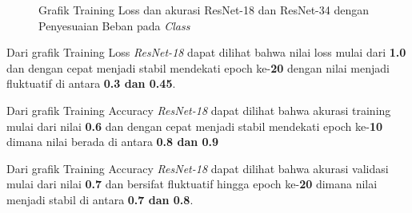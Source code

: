 \begin{figure}[hbtp]
	\centering
	\qquad
	\caption{Grafik Training Loss dan akurasi ResNet-18 dan ResNet-34 dengan Penyesuaian Beban pada \emph{Class}}
	\label{fig:graphTrainingWeightedPt1}
\end{figure}

Dari grafik Training Loss \emph{ResNet-18} dapat dilihat bahwa nilai loss mulai dari \textbf{1.0} dan dengan cepat menjadi stabil mendekati epoch ke-\textbf{20} dengan nilai menjadi fluktuatif di antara \textbf{0.3 dan 0.45}.

Dari grafik Training Accuracy \emph{ResNet-18} dapat dilihat bahwa akurasi training mulai dari nilai \textbf{0.6} dan dengan cepat menjadi stabil mendekati epoch ke-\textbf{10} dimana nilai berada di antara \textbf{0.8 dan 0.9} 

Dari grafik Training Accuracy \emph{ResNet-18} dapat dilihat bahwa akurasi validasi mulai dari nilai \textbf{0.7} dan bersifat fluktuatif hingga epoch ke-\textbf{20} dimana nilai menjadi stabil di antara \textbf{0.7 dan 0.8}.

